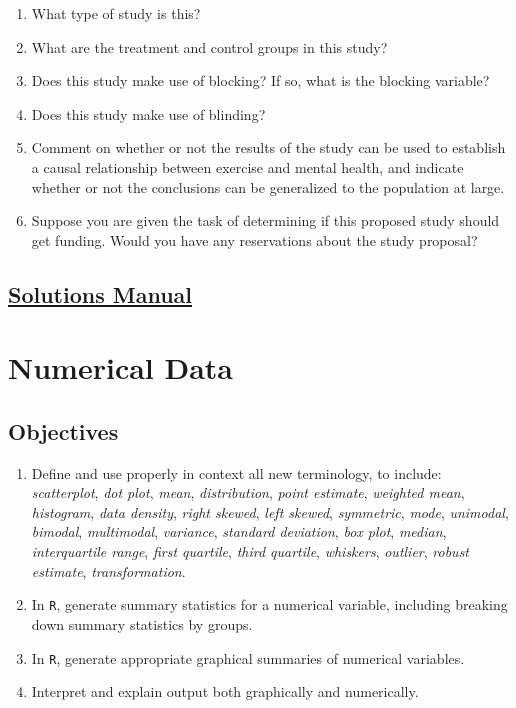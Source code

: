 \documentclass[
  letterpaper,
  DIV=11,
  numbers=noendperiod]{scrreprt}
\begin{document}
\begin{enumerate}
\def\labelenumi{\alph{enumi}.}
\item
  What type of study is this?
\item
  What are the treatment and control groups in this study?
\item
  Does this study make use of blocking? If so, what is the blocking
  variable?
\item
  Does this study make use of blinding?
\item
  Comment on whether or not the results of the study can be used to
  establish a causal relationship between exercise and mental health,
  and indicate whether or not the conclusions can be generalized to the
  population at large.
\item
  Suppose you are given the task of determining if this proposed study
  should get funding. Would you have any reservations about the study
  proposal?
\end{enumerate}

\section*{\texorpdfstring{\href{https://ds-usafa.github.io/CPS-Solutions-Manual/STUDY.html}{Solutions
Manual}}{Solutions Manual}}\label{solutions-manual-4}


\chapter{Numerical Data}\label{NUMDATA}

\section{Objectives}\label{objectives-5}

\begin{enumerate}
\def\labelenumi{\arabic{enumi})}
\item
  Define and use properly in context all new terminology, to include:
  \emph{scatterplot}, \emph{dot plot}, \emph{mean}, \emph{distribution},
  \emph{point estimate}, \emph{weighted mean}, \emph{histogram},
  \emph{data density}, \emph{right skewed}, \emph{left skewed},
  \emph{symmetric}, \emph{mode}, \emph{unimodal}, \emph{bimodal},
  \emph{multimodal}, \emph{variance}, \emph{standard deviation},
  \emph{box plot}, \emph{median}, \emph{interquartile range},
  \emph{first quartile}, \emph{third quartile}, \emph{whiskers},
  \emph{outlier}, \emph{robust estimate}, \emph{transformation}.
\item
  In \texttt{R}, generate summary statistics for a numerical variable,
  including breaking down summary statistics by groups.
\item
  In \texttt{R}, generate appropriate graphical summaries of numerical
  variables.
\item
  Interpret and explain output both graphically and numerically.
\end{enumerate}
\end{document}
